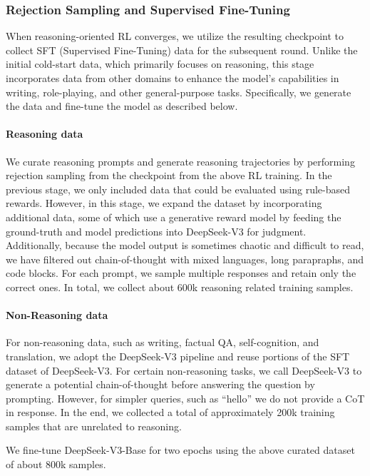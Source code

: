 \documentclass[11pt, a4paper, logo, copyright, nonumbering]{deepseek}
\begin{document}
{\subsubsection{Rejection Sampling and Supervised Fine-Tuning}
When reasoning-oriented RL converges, we utilize the resulting checkpoint to collect SFT (Supervised Fine-Tuning) data for the subsequent round. Unlike the initial cold-start data, which primarily focuses on reasoning, this stage incorporates data from other domains to enhance the model's capabilities in writing, role-playing, and other general-purpose tasks. Specifically, we generate the data and fine-tune the model as described below.
\label{sec:method:r1:sft}


\paragraph{Reasoning data}
We curate reasoning prompts and generate reasoning trajectories by performing rejection sampling from the checkpoint from the above RL training.
In the previous stage, we only included data that could be evaluated using rule-based rewards. However, in this stage, we expand the dataset by incorporating additional data, some of which use a generative reward model by feeding the ground-truth and model predictions into DeepSeek-V3 for judgment.
Additionally, because the model output is sometimes chaotic and difficult to read, we have filtered out chain-of-thought with mixed languages, long parapraphs, and code blocks.
For each prompt, we sample multiple responses and retain only the correct ones. In total, we collect about 600k reasoning related training samples. 

\paragraph{Non-Reasoning data}
For non-reasoning data, such as writing, factual QA, self-cognition, and translation, we adopt the DeepSeek-V3 pipeline and reuse portions of the SFT dataset of DeepSeek-V3. For certain non-reasoning tasks, we call DeepSeek-V3 to generate a potential chain-of-thought before answering the question by prompting. However, for simpler queries, such as ``hello'' we do not provide a CoT in response.
In the end, we collected a total of approximately 200k training samples that are unrelated to reasoning.


We fine-tune DeepSeek-V3-Base for two epochs using the above curated dataset of about 800k samples.


}
\end{document}
